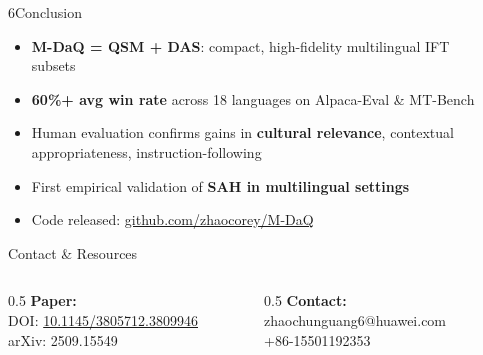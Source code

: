 \documentclass[final]{beamer}
\newlength{\sepwidth}
\newlength{\colwidth}
\newcommand{\separatorcolumn}{\begin{column}{\sepwidth}\end{column}}
\begin{document}
\begin{frame}[t]
\begin{columns}[t]
\begin{column}{\colwidth}
  \begin{block}{\Large 6\quad Conclusion}
    \begin{itemize}
      \item \textbf{M-DaQ = QSM + DAS}: compact, high-fidelity multilingual IFT subsets
      \item \textbf{60\%+ avg win rate} across 18 languages on Alpaca-Eval \& MT-Bench
      \item Human evaluation confirms gains in \textbf{cultural relevance}, contextual appropriateness, instruction-following
      \item First empirical validation of \textbf{SAH in multilingual settings}
      \item Code released: \href{https://github.com/zhaocorey/M-DaQ}{github.com/zhaocorey/M-DaQ}
    \end{itemize}
  \end{block}

  \begin{block}{\Large Contact \& Resources}
    \begin{columns}[t]
      \begin{column}{0.5\textwidth}
        \textbf{Paper:}\\
        DOI: \href{https://doi.org/10.1145/3805712.3809946}{10.1145/3805712.3809946}\\
        arXiv: 2509.15549
      \end{column}
      \begin{column}{0.5\textwidth}
        \textbf{Contact:}\\
        zhaochunguang6@huawei.com\\
        +86-15501192353
      \end{column}
    \end{columns}
  \end{block}

\end{column}

\separatorcolumn
\end{columns}
\end{frame}
\end{document}
